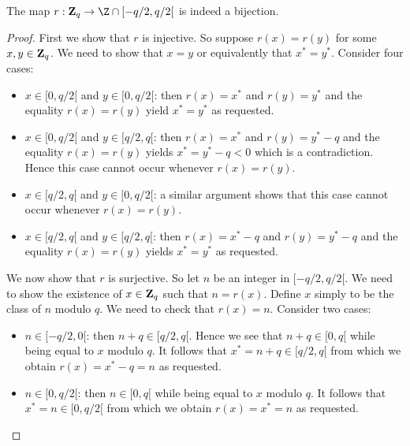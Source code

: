 \documentclass{article}
\newcommand{\zq}{\mbox{${\bf Z}_{q}$}}
\begin{document}
\begin{prop}
  The map $r:\zq\rightarrow\Z\cap[-q/2,q/2[$ is indeed a bijection.
\end{prop}
\begin{proof}
First we show that $r$ is injective. So suppose $r(x)=r(y)$ for some 
$x,y\in\zq$. We need to show that $x=y$ or equivalently that 
$x^{*}=y^{*}$. Consider four cases:
  \begin{itemize}
    \item $x\in[0,q/2[$ and $y\in[0,q/2[$: then $r(x)=x^{*}$ and $r(y)=y^{*}$
      and the equality $r(x)=r(y)$ yield $x^{*}=y^{*}$ as requested.
    \item $x\in[0,q/2[$ and $y\in[q/2,q[$: then $r(x)=x^{*}$ and 
      $r(y)=y^{*}-q$ and the equality $r(x) = r(y)$ yields $x^{*}=y^{*}-q < 0$
      which is a contradiction. Hence this case cannot occur whenever 
      $r(x)=r(y)$.
    \item $x\in[q/2,q[$ and $y\in[0,q/2[$: a similar argument shows that this
      case cannot occur whenever $r(x)=r(y)$.
    \item $x\in[q/2,q[$ and $y\in[q/2,q[$: then $r(x)=x^{*}-q$ and 
      $r(y)=y^{*}-q$ and the equality $r(x)=r(y)$ yields $x^{*}=y^{*}$ as 
      requested.
  \end{itemize}
We now show that $r$ is surjective. So let $n$ be an integer in $[-q/2,q/2[$.
  We need to show the existence of $x\in\zq$ such that $n=r(x)$. Define $x$
  simply to be the class of $n$ modulo $q$. We need to check that $r(x)=n$. 
  Consider two cases:
  \begin{itemize}
    \item $n\in[-q/2,0[$: then $n+q\in[q/2,q[$. Hence we see that $n+q\in[0,q[$
      while being equal to $x$ modulo $q$. It follows that $x^{*}=n+q\in[q/2,q[$
      from which we obtain $r(x) = x^{*} - q = n$ as requested.
    \item $n\in[0,q/2[$: then $n\in[0,q[$ while being equal to $x$ modulo $q$.
      It follows that $x^{*}=n\in[0,q/2[$ from which we obtain $r(x)=x^{*}=n$
      as requested.
  \end{itemize}
\end{proof}
\end{document}
